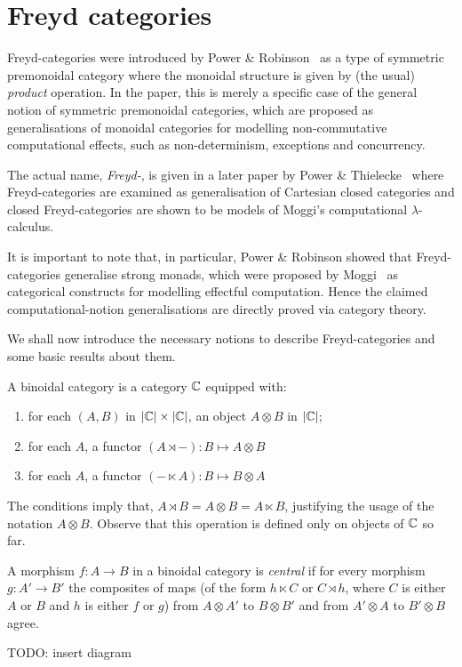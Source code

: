 \section{Freyd categories}

Freyd-categories were introduced by Power \& Robinson~\cite{pow-rob} as a type
of symmetric premonoidal category where the monoidal structure is given by
(the usual) \emph{product} operation. In the paper, this is merely a specific
case of the general notion of symmetric premonoidal categories, which are
proposed as generalisations of monoidal categories for modelling
non-commutative computational effects, such as non-determinism, exceptions and
concurrency.

The actual name, \emph{Freyd-}, is given in a later paper by Power \&
Thielecke~\cite{pow-thie} where Freyd-categories are examined as generalisation
of Cartesian closed categories and closed Freyd-categories are shown to be
models of Moggi's computational $\lambda$-calculus.

It is important to note that, in particular, Power \& Robinson showed that
Freyd-categories generalise strong monads, which were proposed by
Moggi~\cite{moggi-89} as categorical constructs for modelling effectful
computation. Hence the claimed computational-notion generalisations are
directly proved via category theory.

We shall now introduce the necessary notions to describe Freyd-categories and
some basic results about them.

\begin{definition}
    A binoidal category is a category $\mathbb{C}$ equipped with:
    \begin{enumerate}
        \item for each $(A, B)$ in $|\mathbb{C}| \times |\mathbb{C}|$, an object $A \otimes B$
            in $|\mathbb{C}|$;
        \item for each $A$, a functor $(A \rtimes -) : B \mapsto A \otimes B$
        \item for each $A$, a functor $(- \ltimes A) : B \mapsto B \otimes A$
    \end{enumerate}
\end{definition}

The conditions imply that, $A \rtimes B = A \otimes B = A \ltimes B$,
justifying the usage of the notation $A \otimes B$. Observe that this
operation is defined only on objects of $\mathbb{C}$ so far.

\begin{definition}
    A morphism $f: A \to B$ in a binoidal category is \emph{central} if for
    every morphism $g: A' \to B'$ the composites of maps (of the form $h
    \ltimes C$ or $C \rtimes h$, where $C$ is either $A$ or $B$ and $h$ is
    either $f$ or $g$) from $A \otimes A'$ to $B \otimes B'$ and from $A'
    \otimes A$ to $B' \otimes B$ agree.

    TODO: insert diagram
\end{definition}

